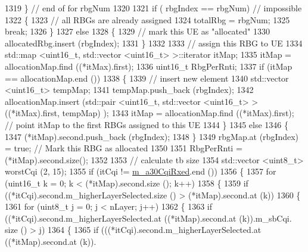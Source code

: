\begin{DoxyCode}
1319             \}  \textcolor{comment}{// end of for rbgNum}
1320 
1321           \textcolor{keywordflow}{if} ( rbgIndex == rbgNum)  \textcolor{comment}{// impossible}
1322             \{
1323               \textcolor{comment}{// all RBGs are already assigned}
1324               totalRbg = rbgNum;
1325               \textcolor{keywordflow}{break};
1326             \}
1327           \textcolor{keywordflow}{else}
1328             \{
1329               \textcolor{comment}{// mark this UE as "allocated"}
1330               allocatedRbg.insert (rbgIndex);
1331             \}
1332 
1333           \textcolor{comment}{// assign this RBG to UE}
1334           std::map <uint16\_t, std::vector <uint16\_t> >::iterator itMap;
1335           itMap = allocationMap.find ((*itMax).first);
1336           uint16\_t RbgPerRnti;
1337           \textcolor{keywordflow}{if} (itMap == allocationMap.end ())
1338             \{
1339               \textcolor{comment}{// insert new element}
1340               std::vector <uint16\_t> tempMap;
1341               tempMap.push\_back (rbgIndex);
1342               allocationMap.insert (std::pair <uint16\_t, std::vector <uint16\_t> > ((*itMax).first, tempMap)
      );
1343               itMap = allocationMap.find ((*itMax).first);  \textcolor{comment}{// point itMap to the first RBGs assigned to
       this UE}
1344             \}
1345           \textcolor{keywordflow}{else}
1346             \{
1347               (*itMap).second.push\_back (rbgIndex);
1348             \}
1349           rbgMap.at (rbgIndex) = \textcolor{keyword}{true};  \textcolor{comment}{// Mark this RBG as allocated}
1350  
1351           RbgPerRnti = (*itMap).second.size();
1352 
1353           \textcolor{comment}{// calculate tb size}
1354           std::vector <uint8\_t> worstCqi (2, 15);
1355           \textcolor{keywordflow}{if} (itCqi != \hyperlink{classns3_1_1FdTbfqFfMacScheduler_a2c52c04323552283ec3f14a7ce083bc2}{m\_a30CqiRxed}.end ())
1356             \{
1357               \textcolor{keywordflow}{for} (uint16\_t k = 0; k < (*itMap).second.size (); k++)
1358                 \{
1359                   \textcolor{keywordflow}{if} ((*itCqi).second.m\_higherLayerSelected.size () > (*itMap).second.at (k))
1360                     \{
1361                       \textcolor{keywordflow}{for} (uint8\_t j = 0; j < nLayer; j++) 
1362                         \{
1363                           \textcolor{keywordflow}{if} ((*itCqi).second.m\_higherLayerSelected.at ((*itMap).second.at (k)).m\_sbCqi.
      size () > j)
1364                             \{
1365                               \textcolor{keywordflow}{if} (((*itCqi).second.m\_higherLayerSelected.at ((*itMap).second.at (k)).

\end{DoxyCode}
